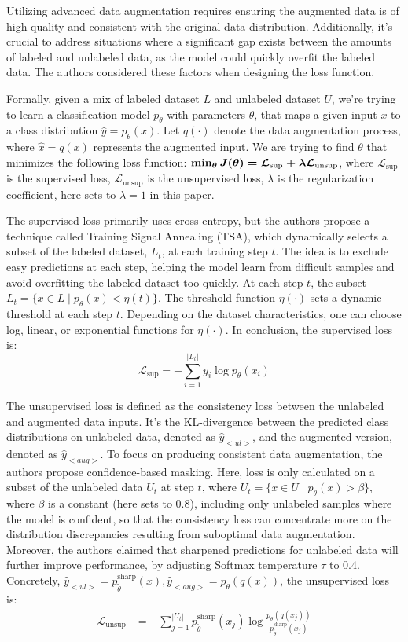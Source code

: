 \documentclass{article}
\begin{document}
Utilizing advanced data augmentation requires ensuring the augmented data is of high 
quality and consistent with the original data distribution. Additionally, it's crucial 
to address situations where a significant gap exists between the amounts of labeled and 
unlabeled data, as the model could quickly overfit the labeled data. The authors 
considered these factors when designing the loss function.

Formally, given a mix of labeled dataset $L$ and unlabeled dataset $U$, we're trying to 
learn a classification model $p_{\theta}$ with parameters $\theta$, that maps a given input $x$
to a class distribution $\hat y = p_{\theta}(x)$. Let $q(\cdot)$ denote 
the data augmentation process, where $\hat x = q(x)$ represents the augmented input. 
We are trying to find $\theta$ that minimizes the following loss function:
$\boldmath \min_{\theta} J(\theta) = \mathcal{L}_{\text{sup}} + \lambda \mathcal{L}_{\text{unsup}}$,
where $\mathcal{L}_{\text{sup}}$ is the supervised loss, $\mathcal{L}_{\text{unsup}}$ is
the unsupervised loss, $\lambda$ is the regularization coefficient, here
sets to $\lambda = 1$ in this paper.

The supervised loss primarily uses cross-entropy, but the authors propose a technique 
called Training Signal Annealing (TSA), which dynamically selects a subset of the labeled 
dataset, $L_t$, at each training step $t$. The idea is to exclude easy predictions at 
each step, helping the model learn from difficult samples and avoid overfitting the 
labeled dataset too quickly. At each step $t$, the subset $L_t = \{x \in L \mid 
p_{\theta}(x) < \eta(t)\}$. The threshold function $\eta(\cdot)$ sets a dynamic 
threshold at each step $t$. Depending on the dataset characteristics, one can choose 
log, linear, or exponential functions for $\eta(\cdot)$. In conclusion, the supervised loss
is:
$$\mathcal{L}_{\text{sup}} = - \sum_{i=1}^{|L_t|} y_i \log p_{\theta}(x_i)$$

The unsupervised loss is defined as the consistency loss between the unlabeled and 
augmented data inputs. It's the KL-divergence between the predicted class distributions 
on unlabeled data, denoted as $\hat y_{<ul>}$, and the augmented version, denoted as 
$\hat y_{<aug>}$.
To focus on producing consistent data augmentation, the authors propose 
confidence-based masking. Here, loss is only calculated on a subset of the unlabeled 
data $U_t$ at step $t$, where $U_t = \{x \in U \mid p_{\theta}(x) > \beta\}$, where $\beta$ 
is a constant (here sets to 0.8), including only unlabeled samples where the model is confident,
so that the consistency loss can concentrate more on the distribution discrepancies 
resulting from suboptimal data augmentation.
Moreover, the authors claimed that sharpened predictions for unlabeled data will
further improve performance, by adjusting Softmax temperature $\tau$ to 0.4. Concretely,
$\hat y_{<ul>} = p_{\tilde{\theta}}^{\text{sharp}}(x), \hat y_{<aug>} = p_{\theta}(q(x))$,
the unsupervised loss is:
\begin{align*}
  \mathcal{L}_{\text{unsup}}
  &= - \sum_{j=1}^{|U_t|} p_{\tilde{\theta}}^{\text{sharp}}(x_j) \log 
  \frac{p_{\theta}(q(x_j))}{p_{\tilde{\theta}}^{\text{sharp}}(x_j)}
\end{align*}
\end{document}
